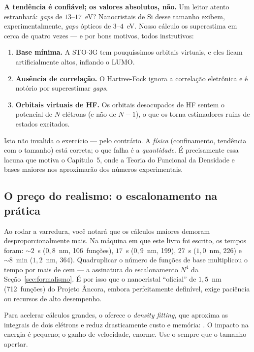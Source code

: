 \begin{caixaatencao}
\textbf{A tendência é confiável; os valores absolutos, não.} Um leitor atento
estranhará: \emph{gaps} de $13$--$17$~eV? Nanocristais de Si desse tamanho exibem,
experimentalmente, \emph{gaps} ópticos de $3$--$4$~eV. Nosso cálculo os
superestima em cerca de quatro vezes --- e por bons motivos, todos instrutivos:
\begin{enumerate}[leftmargin=*,nosep]
  \item \textbf{Base mínima.} A STO-3G tem pouquíssimos orbitais virtuais, e eles
        ficam artificialmente altos, inflando o LUMO.
  \item \textbf{Ausência de correlação.} O Hartree-Fock ignora a correlação
        eletrônica e é notório por superestimar \emph{gaps}.
  \item \textbf{Orbitais virtuais de HF.} Os orbitais desocupados de HF sentem o
        potencial de $N$ elétrons (e não de $N-1$), o que os torna estimadores
        ruins de estados excitados.
\end{enumerate}
Isto não invalida o exercício --- pelo contrário. A \emph{física} (confinamento,
tendência com o tamanho) está correta; o que falha é a \emph{quantidade}. É
precisamente essa lacuna que motiva o Capítulo~5, onde a Teoria do Funcional da
Densidade e bases maiores nos aproximarão dos números experimentais.
\end{caixaatencao}

\subsection{O preço do realismo: o escalonamento na prática}

Ao rodar a varredura, você notará que os cálculos maiores demoram
desproporcionalmente mais. Na máquina em que este livro foi escrito, os tempos
foram: $\sim\!2$~s ($0{,}8$~nm, 106~funções), $17$~s ($0{,}9$~nm, 199), $27$~s
($1{,}0$~nm, 226) e $\sim\!8$~min ($1{,}2$~nm, 364). Quadruplicar o número de
funções de base multiplicou o tempo por mais de cem --- a assinatura do
escalonamento $N^4$ da Seção~\ref{sec:formalismo}. É por isso que o nanocristal
``oficial'' de $1{,}5$~nm (712~funções) do Projeto Âncora, embora perfeitamente
definível, exige paciência ou recursos de alto desempenho.

\begin{caixadica}
Para acelerar cálculos grandes, o \pyscf{} oferece o \emph{density fitting}, que
aproxima as integrais de dois elétrons e reduz drasticamente custo e memória:
. O impacto na energia é pequeno; o ganho de
velocidade, enorme. Use-o sempre que o tamanho apertar.
\end{caixadica}

